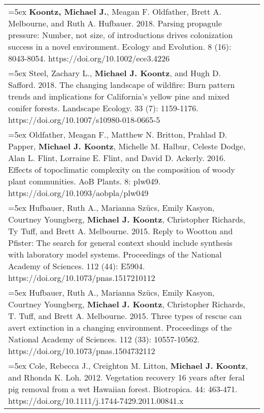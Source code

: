 \begin{longtable}{@{} >{\raggedright}p{5.25in} >{\raggedleft}X @{}}
\hangindent=5ex \textbf{Koontz, Michael J.}, Meagan F. Oldfather, Brett A. Melbourne, and Ruth A. Hufbauer. 2018. Parsing propagule pressure: Number, not size, of introductions drives colonization success in a novel environment. Ecology and Evolution. 8 (16): 8043-8054. https://doi.org/10.1002/ece3.4226 & 2018 \tabularnewline

\hangindent=5ex Steel, Zachary L., \textbf{Michael J. Koontz}, and Hugh D. Safford. 2018. The changing landscape of wildfire: Burn pattern trends and implications for California's yellow pine and mixed conifer forests. Landscape Ecology. 33 (7): 1159-1176. https://doi.org/10.1007/s10980-018-0665-5 & 2018 \tabularnewline

\hangindent=5ex Oldfather, Meagan F., Matthew N. Britton, Prahlad D. Papper, \textbf{Michael J. Koontz}, Michelle M. Halbur, Celeste Dodge, Alan L. Flint, Lorraine E. Flint, and David D. Ackerly. 2016. Effects of topoclimatic complexity on the composition of woody plant communities. AoB Plants. 8: plw049. https://doi.org/10.1093/aobpla/plw049 & 2016 \tabularnewline

\hangindent=5ex Hufbauer, Ruth A., Marianna Sz\"ucs, Emily Kasyon, Courtney Youngberg, \textbf{Michael J. Koontz}, Christopher Richards, Ty Tuff, and Brett A. Melbourne. 2015. Reply to Wootton and Pfister: The search for general context should include synthesis with laboratory model systems. Proceedings of the National Academy of Sciences. 112 (44): E5904. https://doi.org/10.1073/pnas.1517210112 & 2015 \tabularnewline

\hangindent=5ex Hufbauer, Ruth A., Marianna Sz\"ucs, Emily Kasyon, Courtney Youngberg, \textbf{Michael J. Koontz}, Christopher Richards, T. Tuff, and Brett A. Melbourne. 2015. Three types of rescue can avert extinction in a changing environment. Proceedings of the National Academy of Sciences. 112 (33): 10557-10562. https://doi.org/10.1073/pnas.1504732112 & 2015 \tabularnewline

\hangindent=5ex Cole, Rebecca J., Creighton M. Litton, \textbf{Michael J. Koontz}, and Rhonda K. Loh. 2012. Vegetation recovery 16 years after feral pig removal from
a wet Hawaiian forest. Biotropica. 44: 463-471. https://doi.org/10.1111/j.1744-7429.2011.00841.x & 2012 \tabularnewline

\end{longtable}
